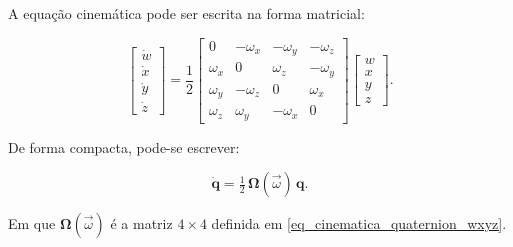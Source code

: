 A equação cinemática pode ser escrita na forma matricial:

\begin{equation}
\begin{bmatrix}
\dot{w} \\[2pt]
\dot{x} \\[2pt]
\dot{y} \\[2pt]
\dot{z}
\end{bmatrix}
=
\frac{1}{2}
\begin{bmatrix}
0 & -\omega_x & -\omega_y & -\omega_z \\
\omega_x & 0 & \omega_z & -\omega_y \\
\omega_y & -\omega_z & 0 & \omega_x \\
\omega_z & \omega_y & -\omega_x & 0
\end{bmatrix}
\begin{bmatrix}
w \\ x \\ y \\ z
\end{bmatrix}.
\label{eq_cinematica_quaternion_wxyz}
\end{equation}

De forma compacta, pode-se escrever:

\begin{equation}
\dot{\mathbf{q}} = \tfrac{1}{2}\,\boldsymbol{\Omega}(\vec{\omega})\,\mathbf{q}.
\label{eq_quat_compacta}
\end{equation}

Em que $\boldsymbol{\Omega}(\vec{\omega})$ é a matriz $4\times 4$ definida em \eqref{eq_cinematica_quaternion_wxyz}.
